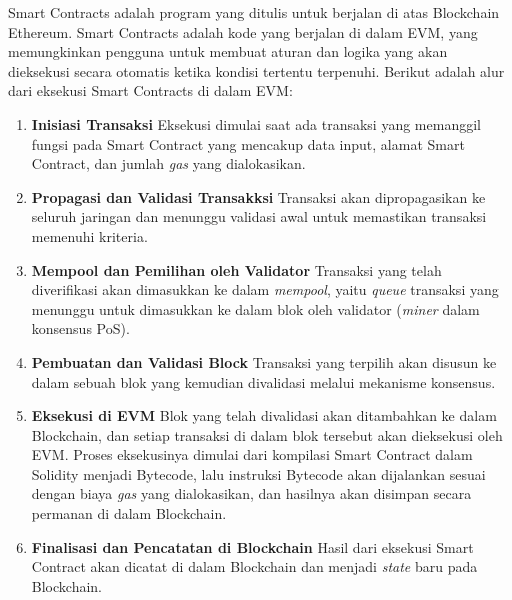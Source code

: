 Smart Contracts adalah program yang ditulis untuk berjalan di atas Blockchain Ethereum. Smart Contracts adalah kode yang berjalan di dalam EVM, yang memungkinkan pengguna untuk membuat aturan dan logika yang akan dieksekusi secara otomatis ketika kondisi tertentu terpenuhi. Berikut adalah alur dari eksekusi Smart Contracts di dalam EVM:

\begin{enumerate}
  \item \textbf{Inisiasi Transaksi} \newline
  Eksekusi dimulai saat ada transaksi yang memanggil fungsi pada Smart Contract yang mencakup data input, alamat Smart Contract, dan jumlah \textit{gas} yang dialokasikan.
  \item \textbf{Propagasi dan Validasi Transakksi} \newline
  Transaksi akan dipropagasikan ke seluruh jaringan dan menunggu validasi awal untuk memastikan transaksi memenuhi kriteria.
  \item \textbf{Mempool dan Pemilihan oleh Validator} \newline
  Transaksi yang telah diverifikasi akan dimasukkan ke dalam \textit{mempool}, yaitu \textit{queue} transaksi yang menunggu untuk dimasukkan ke dalam blok oleh validator (\textit{miner} dalam konsensus PoS).
  \item \textbf{Pembuatan dan Validasi Block} \newline
  Transaksi yang terpilih akan disusun ke dalam sebuah blok yang kemudian divalidasi melalui mekanisme konsensus.
  \item \textbf{Eksekusi di EVM} \newline
  Blok yang telah divalidasi akan ditambahkan ke dalam Blockchain, dan setiap transaksi di dalam blok tersebut akan dieksekusi oleh EVM. Proses eksekusinya dimulai dari kompilasi Smart Contract dalam Solidity menjadi Bytecode, lalu instruksi Bytecode akan dijalankan sesuai dengan biaya \textit{gas} yang dialokasikan, dan hasilnya akan disimpan secara permanan di dalam Blockchain.
  \item \textbf{Finalisasi dan Pencatatan di Blockchain} \newline
  Hasil dari eksekusi Smart Contract akan dicatat di dalam Blockchain dan menjadi \textit{state} baru pada Blockchain. 
\end{enumerate}



